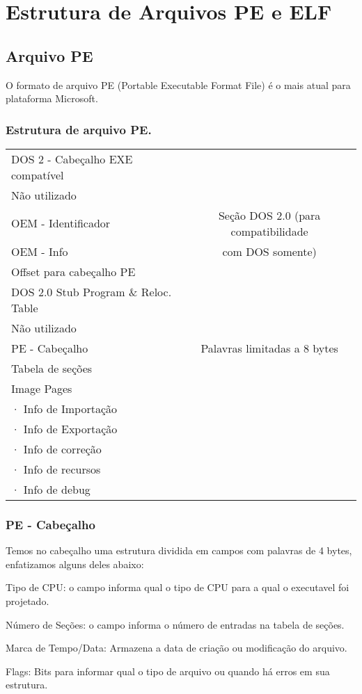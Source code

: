 \chapter{Estrutura de Arquivos PE e ELF}

\section{Arquivo PE}

O formato de arquivo PE (Portable Executable Format File) é o mais atual para plataforma Microsoft.


\subsection{Estrutura de arquivo PE.}
\begin{list}{}
\item {\begin{tabular}{|l|c|}
\hline 
DOS 2 - Cabeçalho EXE compatível  & \tabularnewline
\cline{1-1} 
Não utilizado  & \tabularnewline
\cline{1-1} 
OEM - Identificador  & Seção DOS 2.0 (para compatibilidade \tabularnewline
OEM - Info  & com DOS somente)\tabularnewline
Offset para cabeçalho PE & \tabularnewline
\cline{1-1} 
DOS 2.0 Stub Program \& Reloc. Table  & \tabularnewline
\hline 
Não utilizado & \tabularnewline
\hline 
PE - Cabeçalho & Palavras limitadas a 8 bytes\tabularnewline
\hline 
Tabela de seções & \tabularnewline
\hline
Image Pages  & \tabularnewline
· Info de Importação & \tabularnewline
· Info de Exportação  & \tabularnewline
· Info de correção & \tabularnewline
· Info de recursos & \tabularnewline
· Info de debug & \tabularnewline
\hline
\end{tabular}}
\end{list}

\subsection{PE - Cabeçalho}


Temos no cabeçalho uma estrutura dividida em campos com palavras
de 4 bytes, enfatizamos alguns deles abaixo:


Tipo de CPU: o campo informa qual o tipo de CPU para a qual o executavel
foi projetado.


Número de Seções: o campo informa o número de entradas na tabela
de seções.


Marca de Tempo/Data: Armazena a data de criação ou modificação do
arquivo.


Flags: Bits para informar qual o tipo de arquivo ou quando há erros
em sua estrutura.


